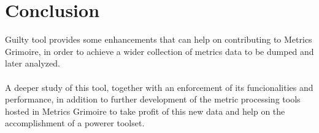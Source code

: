\documentclass[11pt]{article}
\begin{document}
\section{Conclusion}
Guilty tool provides some enhancements that can help on contributing to Metrics Grimoire, in order to achieve a wider collection of metrics data to be dumped and later analyzed.\\
\\
A deeper study of this tool, together with an enforcement of its funcionalities and performance, in addition to further development of the metric processing tools hosted in Metrics Grimoire to take profit of this new data and help on the accomplishment of a powerer toolset.\\
\end{document}
